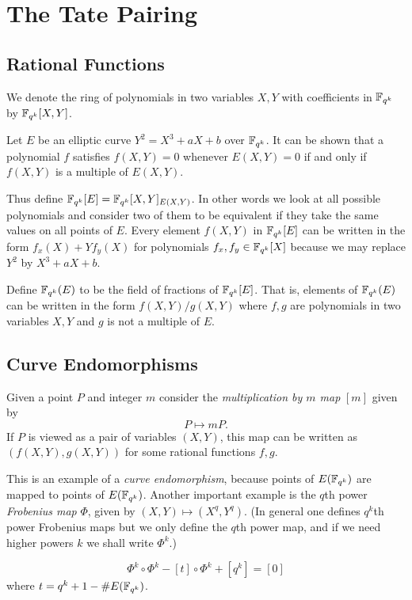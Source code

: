 \chapter {The Tate Pairing}

\section {Rational Functions}

We denote the ring of polynomials in two variables $X,Y$
with coefficients in $\mathbb{F}_{q^k}$ by $\mathbb{F}_{q^k}[X,Y]$. 

Let $E$ be an elliptic curve $Y^2 = X^3 + aX + b$ over $\mathbb{F}_{q^k}$.
It can be shown that a polynomial $f$ satisfies $f(X,Y) = 0$
whenever $E(X,Y) = 0$ if and only if $f(X,Y)$ is a multiple of $E(X,Y)$.

Thus define $\mathbb{F}_{q^k}[E] = \mathbb{F}_{q^k}[X,Y]_{E(X,Y)}$. In other words we look at all
possible polynomials and consider two of them to be
equivalent if they take the same values on all points of $E$.
Every element $f(X,Y)$ in $\mathbb{F}_{q^k}[E]$ can be written in the form
$f_x(X) + Y f_y(X)$ for polynomials $f_x, f_y \in \mathbb{F}_{q^k}[X]$ because
we may replace $Y^2$ by $X^3 + aX + b$.

Define $\mathbb{F}_{q^k}(E)$ to be the field of fractions of $\mathbb{F}_{q^k}[E]$.
That is, elements of $\mathbb{F}_{q^k}(E)$ can be written in the form
$f(X,Y) / g(X,Y)$ where $f, g$ are polynomials in two variables $X, Y$
and $g$ is not a multiple of $E$.

\section {Curve Endomorphisms}

Given a point $P$ and integer $m$ consider the \emph{multiplication by $m$ map}
$[m]$ given by \[ P \mapsto m P . \]
If $P$ is viewed as a pair of variables $(X,Y)$, this map
can be written as $(f(X,Y), g(X,Y))$ for some rational functions $f,g$.

This is an example of a \emph{curve endomorphism}, because points of
$E(\mathbb{F}_{q^k})$ are mapped to points of $E(\mathbb{F}_{q^k})$. Another important example
is the $q$th power \emph{Frobenius map} $\Phi$,
given by $(X, Y) \mapsto (X^{q}, Y^{q})$. (In general one defines
$q^k$th power Frobenius maps but we only define the $q$th power map,
and if we need higher powers $k$ we shall write $\Phi^k$.)

\begin{theorem}
[Hasse]
\[ \Phi^k \circ \Phi^k - [t] \circ \Phi^k + [q^k] = [0] \]
where $t = q^k + 1 - \#E(\mathbb{F}_{q^k})$.
\end{theorem}

